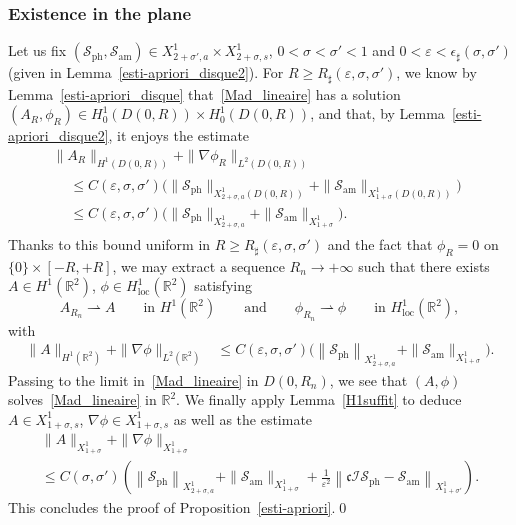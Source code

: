 \documentclass[AHL,Unicode,longabstracts,published]{cedram}
\newcommand*\R{\mathbb R}
\newcommand{\amm}{\mathrm{am}}
\newcommand{\phl}{\mathrm{ph}}
\newcommand{\locc}{\mathrm{loc}}
\newcommand*\BI{\mathcal{I}}
\newcommand*\BS{\mathcal{S}}
\newcommand*\cs{{\mathfrak c}}
\newcommand*\ii{\infty}
\newcommand*\gs{\geqslant }
\newcommand*\ls{\leqslant }
\newcommand*\e{\varepsilon}
\newcommand*\ep{\epsilon}
\newcommand*\s{\sigma}
\begin{document}
\subsubsection{Existence in the plane}

Let us fix $ (\BS_{\phl}, \BS_{\amm}) \in X^1_{2+\s',a} \times X^1_{2+\s,s} $, $ 0 < \s < \s' < 1 $ and $ 0 < \e < \ep_\sharp (\s, \s') $ (given in Lemma~\ref{esti-apriori_disque2}). For $ R \gs R_\sharp (\e, \s, \s') $, we know by Lemma~\ref{esti-apriori_disque} that~\eqref{Mad_lineaire} has a solution $ (A_R, \phi_R) \in H^{1}_0(D(0,R)) \times H^{1}_0(D(0,R)) $, and that, by Lemma~\ref{esti-apriori_disque2}, it enjoys the estimate
\begin{multline*}
\| A_R \|_{ H^1(D(0,R)) }  + \| \nabla \phi_R \|_{ L^2 (D(0,R)) }\\
\begin{aligned}
& \ls C (\e, \s, \s')
\Big(
\| \BS_{\phl} \|_{ X^{1}_{ 2+\s, a} (D(0,R))} + \| \BS_{\amm} \|_{ X^{ 1}_{1+\s} (D(0,R))} \Big)
\\ & \ls C (\e, \s, \s')
\Big(
\| \BS_{\phl} \|_{ X^{1}_{ 2+\s, a} } + \| \BS_{\amm} \|_{ X^{ 1}_{1+\s} } \Big).
\end{aligned}
\end{multline*}
Thanks to this bound uniform in $ R \gs R_\sharp (\e, \s, \s') $ and the fact that $ \phi_R = 0 $ on $ \{ 0 \} \times [-R,+R] $, we may extract a sequence $ R_n \to +\ii $ such that there exists $ A \in H^1 (\R^2) $, $ \phi \in H^1_{\locc} (\R^2) $ satisfying
\[
A_{R_n} \rightharpoonup A \qquad \text{in } H^1 (\R^2)
\qquad \text {and} \qquad
\phi_{R_n} \rightharpoonup \phi \qquad \text{in } H^1_{\locc} (\R^2),
\]
with
\begin{align*}
\| A \|_{ H^1(\R^2) } + \| \nabla \phi \|_{ L^2 (\R^2) } & \ls C (\e, \s, \s')
\Big(
\left\| \BS_{\phl} \right\|_{ X^{1}_{ 2+\s, a} } + \| \BS_{\amm} \|_{ X^{ 1}_{1+\s} } \Big).
\end{align*}
Passing to the limit in~\eqref{Mad_lineaire} in $ D(0,R_n) $, we see that $ (A, \phi) $ solves~\eqref{Mad_lineaire} in $ \R^2 $. We finally apply Lemma~\ref{H1suffit} to deduce $ A \in X^1_{1+\s, s} $, $ \nabla \phi \in X^1_{1+\s, s} $ as well as the estimate
\begin{multline*}
\| A \|_{ X^1_{ 1+ \s} } + \| \nabla \phi \|_{ X^1_{1+ \s} }\\
\ls C (\s, \s')
\left(
\left\| \BS_{\phl} \right\|_{ X^{1}_{ 2+\s, a} } + \| \BS_{\amm} \|_{ X^{ 1}_{1+\s} } + \frac{1}{\e^2} \left\| \cs \BI \BS_{\phl} - \BS_{\amm} \right\|_{ X^{1}_{1+\s'} }
\right).
\end{multline*}
This concludes the proof of Proposition~\ref{esti-apriori}.\qed
\end{document}

